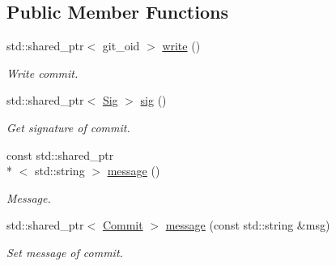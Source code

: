 \subsection*{Public Member Functions}
\begin{DoxyCompactItemize}
\item 
std\-::shared\-\_\-ptr$<$ git\-\_\-oid $>$ \hyperlink{class_git_1_1_commit_a2a1b16bcfd4b7a75975989eb82fe3e15}{write} ()
\begin{DoxyCompactList}\small\item\em Write commit. \end{DoxyCompactList}\item 
std\-::shared\-\_\-ptr$<$ \hyperlink{class_git_1_1_sig}{Sig} $>$ \hyperlink{class_git_1_1_commit_a617691251680bf70172e8518fb843039}{sig} ()
\begin{DoxyCompactList}\small\item\em Get signature of commit. \end{DoxyCompactList}\item 
const std\-::shared\-\_\-ptr\\*
$<$ std\-::string $>$ \hyperlink{class_git_1_1_commit_ae4bc4aedc443268ecfc5a02aaffc34ce}{message} ()
\begin{DoxyCompactList}\small\item\em Message. \end{DoxyCompactList}\item 
std\-::shared\-\_\-ptr$<$ \hyperlink{class_git_1_1_commit}{Commit} $>$ \hyperlink{class_git_1_1_commit_a818d2cbd21bff936e6c0fcbc2a4b4017}{message} (const std\-::string \&msg)
\begin{DoxyCompactList}\small\item\em Set message of commit. \end{DoxyCompactList}\end{DoxyCompactItemize}
